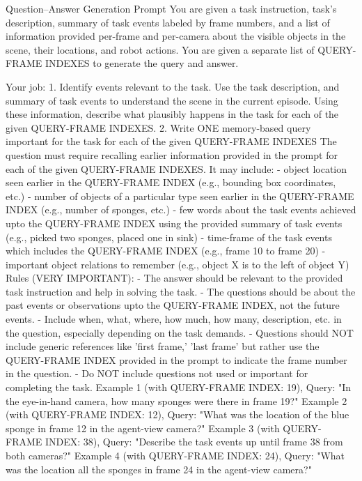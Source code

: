 \begin{FullWidthPromptBox}{Question--Answer Generation Prompt}
You are given a task instruction, task's description, summary of task events labeled by frame numbers, and a list of information provided per-frame and per-camera about the visible objects in the scene, their locations, and robot actions.
You are given a separate list of QUERY-FRAME INDEXES to generate the query and answer.

Your job:
1. Identify events relevant to the task.
  Use the task description, and summary of task events to understand the scene in the current episode.
  Using these information, describe what plausibly happens in the task for each of the given QUERY-FRAME INDEXES.
2. Write ONE memory-based query important for the task for each of the given QUERY-FRAME INDEXES
  The question must require recalling earlier information provided in the prompt for each of the given QUERY-FRAME INDEXES. It may include: 
    - object location seen earlier in the QUERY-FRAME INDEX (e.g., bounding box coordinates, etc.)
    - number of objects of a particular type seen earlier in the QUERY-FRAME INDEX (e.g., number of sponges, etc.)
    - few words about the task events achieved upto the QUERY-FRAME INDEX using the provided summary of task events (e.g., picked two sponges, placed one in sink)
    - time-frame of the task events which includes the QUERY-FRAME INDEX (e.g., frame 10 to frame 20)
    - important object relations to remember (e.g., object X is to the left of object Y)
  Rules (VERY IMPORTANT):
    - The answer should be relevant to the provided task instruction and help in solving the task.
    - The questions should be about the past events or observations upto the QUERY-FRAME INDEX, not the future events.
    - Include when, what, where, how much, how many, description, etc. in the question, especially depending on the task demands.
    - Questions should NOT include generic references like 'first frame,' 'last frame' but rather use the QUERY-FRAME INDEX provided in the prompt to indicate the frame number in the question.
    - Do NOT include questions not used or important for completing the task.
  Example 1 (with QUERY-FRAME INDEX: 19), Query: "In the eye-in-hand camera, how many sponges were there in frame 19?"
  Example 2 (with QUERY-FRAME INDEX: 12), Query: "What was the location of the blue sponge in frame 12 in the agent-view camera?"
  Example 3 (with QUERY-FRAME INDEX: 38), Query: "Describe the task events up until frame 38 from both cameras?"
  Example 4 (with QUERY-FRAME INDEX: 24), Query: "What was the location all the sponges in frame 24 in the agent-view camera?"

\end{FullWidthPromptBox}
